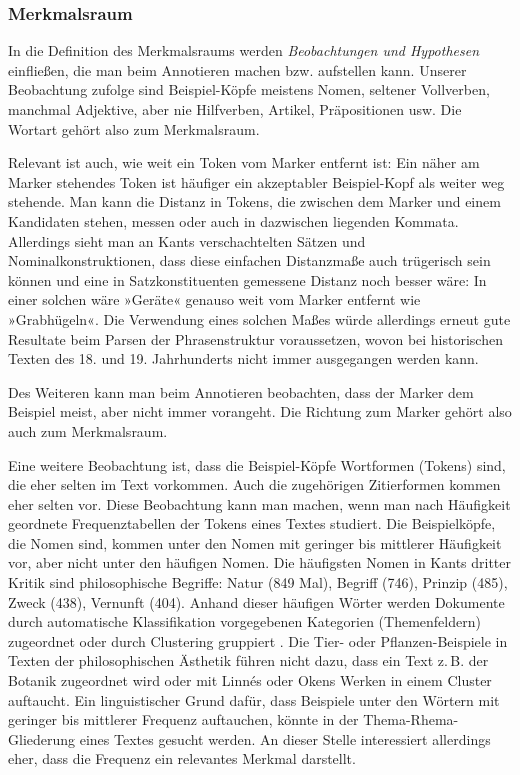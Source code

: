 \documentclass{article}
\begin{document}
\subsubsection{Merkmalsraum}

In die Definition des Merkmalsraums werden \emph{Beobachtungen und
  Hypothesen} einfließen, die man beim Annotieren machen
bzw. aufstellen kann. Unserer Beobachtung zufolge sind Beispiel-Köpfe
meistens Nomen, seltener Vollverben, manchmal Adjektive, aber nie
Hilfverben, Artikel, Präpositionen usw. Die Wortart gehört also zum
Merkmalsraum.

Relevant ist auch, wie weit ein Token vom Marker entfernt ist: Ein
näher am Marker stehendes Token ist häufiger ein akzeptabler
Beispiel-Kopf als weiter weg stehende. Man kann die Distanz in Tokens,
die zwischen dem Marker und einem Kandidaten stehen, messen
oder auch in dazwischen liegenden Kommata. Allerdings sieht man an
Kants verschachtelten Sätzen und Nominalkonstruktionen, dass diese
einfachen Distanzmaße auch trügerisch sein können und eine in
Satzkonstituenten gemessene Distanz noch besser wäre: In einer solchen
wäre »Geräte« genauso weit vom Marker entfernt wie »Grabhügeln«. Die
Verwendung eines solchen Maßes würde allerdings erneut gute Resultate
beim Parsen der Phrasenstruktur voraussetzen, wovon bei historischen
Texten des 18. und 19. Jahrhunderts nicht immer ausgegangen werden
kann.

Des Weiteren kann man beim Annotieren beobachten, dass der Marker dem
Beispiel meist, aber nicht immer vorangeht. Die Richtung zum Marker
gehört also auch zum Merkmalsraum.

Eine weitere Beobachtung ist, dass die Beispiel-Köpfe Wortformen
(Tokens) sind, die eher selten im Text vorkommen. Auch die zugehörigen
Zitierformen kommen eher selten vor. Diese Beobachtung kann man
machen, wenn man nach Häufigkeit geordnete Frequenztabellen der Tokens
eines Textes studiert. Die Beispielköpfe, die Nomen sind, kommen unter
den Nomen mit geringer bis mittlerer Häufigkeit vor, aber nicht unter
den häufigen Nomen. Die häufigsten Nomen in Kants dritter Kritik sind
philosophische Begriffe: Natur (849 Mal), Begriff (746), Prinzip
(485), Zweck (438), Vernunft (404). Anhand dieser häufigen Wörter
werden Dokumente durch automatische Klassifikation vorgegebenen
Kategorien (Themenfeldern) zugeordnet \parencite{Sebastiani2002a} oder
durch Clustering gruppiert \parencite[195--209]{Heyer2006a}. Die Tier-
oder Pflanzen-Beispiele in Texten der philosophischen Ästhetik führen
nicht dazu, dass ein Text z.\,B. der Botanik zugeordnet wird oder mit
Linnés oder Okens Werken in einem Cluster auftaucht. Ein
linguistischer Grund dafür, dass Beispiele unter den Wörtern mit
geringer bis mittlerer Frequenz auftauchen, könnte in der
Thema-Rhema-Gliederung eines Textes gesucht
werden. \Parencite[784-786]{Bussm1990} An dieser Stelle interessiert
allerdings eher, dass die Frequenz ein relevantes Merkmal darstellt.
\end{document}
